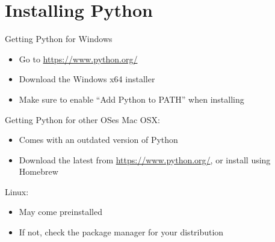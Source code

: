 \part{Installing Python}
\frame{\partpage}

\begin{frame}{Getting Python for Windows}
    \begin{itemize}
        \pause\item Go to \url{https://www.python.org/}
        \pause\item Download the Windows x64 installer
        \pause\item Make sure to enable ``Add Python to PATH'' when installing
    \end{itemize}
\end{frame}

\begin{frame}{Getting Python for other OSes}
    \pause Mac OSX:
    \begin{itemize}
        \pause\item Comes with an outdated version of Python
        \pause\item Download the latest from \url{https://www.python.org/}, or install using Homebrew
    \end{itemize}
    \pause Linux:
    \begin{itemize}
        \pause\item May come preinstalled
        \pause\item If not, check the package manager for your distribution
    \end{itemize}
\end{frame}

